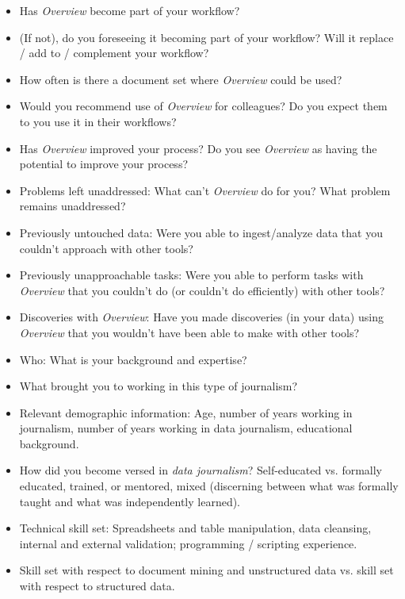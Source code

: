 \begin{itemize}
    \item Has {\it Overview} become part of your workflow?
    \item (If not), do you foreseeing it becoming part of your workflow? Will it replace / add to / complement your workflow?
    \item How often is there a document set where {\it Overview} could be used?
    \item Would you recommend use of {\it Overview} for colleagues? Do you expect them to you use it in their workflows?
    \item Has {\it Overview} improved your process? Do you see {\it Overview} as having the potential to improve your process?
    \item Problems left unaddressed: What can't {\it Overview} do for you? What problem remains unaddressed?
    \item Previously untouched data: Were you able to ingest/analyze data that you couldn't approach with other tools?
    \item Previously unapproachable tasks: Were you able to perform tasks with {\it Overview} that you couldn't do (or couldn't do efficiently) with other tools?
    \item Discoveries with {\it Overview}: Have you made discoveries (in your data) using {\it Overview} that you wouldn't have been able to make with other tools?
\end{itemize}


\begin{itemize}
    \item Who: What is your background and expertise?
    \item What brought you to working in this type of journalism?
    \item Relevant demographic information: Age, number of years working in journalism, number of years working in data journalism, educational background.
    \item How did you become versed in {\it data journalism}? Self-educated vs. formally educated, trained, or mentored, mixed (discerning between what was formally taught and what was independently learned). 
    \item Technical skill set: Spreadsheets and table manipulation, data cleansing, internal and external validation; programming / scripting experience.
    \item Skill set with respect to document mining and unstructured data vs. skill set with respect to structured data.
\end{itemize}

